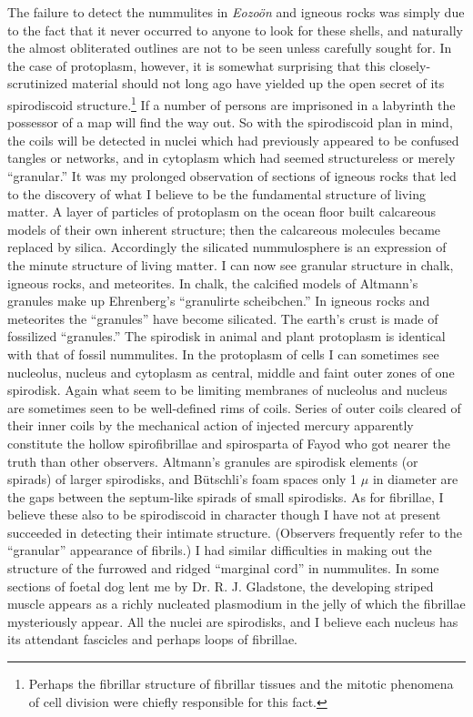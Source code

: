 \documentclass[a4paper, 12pt, oneside]{article}
\begin{document}
The failure to detect the nummulites in \emph{Eozoön} and igneous rocks was simply due to the fact that it never occurred to anyone to look for these shells, and naturally the almost obliterated outlines are not to be seen unless carefully sought for. In the case of protoplasm, however, it is somewhat surprising that this closely-scrutinized material should not long ago have yielded up the open secret of its spirodiscoid structure.\footnote{Perhaps the fibrillar structure of fibrillar tissues and the mitotic phenomena of cell division were chiefly responsible for this fact.} If a number of persons are imprisoned in a labyrinth the possessor of a map will find the way out. So with the spirodiscoid plan in mind, the coils will be detected in nuclei which had previously appeared to be confused tangles or networks, and in cytoplasm which had seemed structureless or merely ``granular.'' It was my prolonged observation of sections of igneous rocks that led to the discovery of what I believe to be the fundamental structure of living matter. A layer of particles of protoplasm on the ocean floor built calcareous models of their own inherent structure; then the calcareous molecules became replaced by silica. Accordingly the silicated nummulosphere is an expression of the minute structure of living matter. I can now see granular structure in chalk, igneous rocks, and meteorites. In chalk, the calcified models of Altmann's granules make up Ehrenberg's ``granulirte scheibchen.'' In igneous rocks and meteorites the ``granules'' have become silicated. The earth's crust is made of fossilized ``granules.'' The spirodisk in animal and plant protoplasm is identical with that of fossil nummulites. In the protoplasm of cells I can sometimes see nucleolus, nucleus and cytoplasm as central, middle and faint outer zones of one spirodisk. Again what seem to be limiting membranes of nucleolus and nucleus are sometimes seen to be well-defined rims of coils. Series of outer coils cleared of their inner coils by the mechanical action of injected mercury apparently constitute the hollow spirofibrillae and spirosparta of Fayod who got nearer the truth than other observers. Altmann's granules are spirodisk elements (or spirads) of larger spirodisks, and Bütschli's foam spaces only 1 $\mu$ in diameter are the gaps between the septum-like spirads of small spirodisks. As for fibrillae, I believe these also to be spirodiscoid in character though I have not at present succeeded in detecting their intimate structure. (Observers frequently refer to the ``granular'' appearance of fibrils.) I had similar difficulties in making out the structure of the furrowed and ridged ``marginal cord'' in nummulites. In some sections of foetal dog lent me by Dr. R. J. Gladstone, the developing striped muscle appears as a richly nucleated plasmodium in the jelly of which the fibrillae mysteriously appear. All the nuclei are spirodisks, and I believe each nucleus has its attendant fascicles and perhaps loops of fibrillae.
\end{document}
